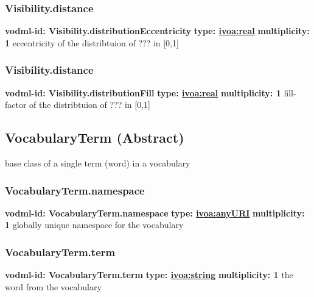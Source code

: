     \subsubsection{Visibility.distance}
      \textbf{vodml-id: Visibility.distributionEccentricity} \newline
      \textbf{type: \hyperref[sect:ivoa]{ivoa:real}} \newline
      \textbf{multiplicity: 1} \newline
      eccentricity of the distribtuion of ??? in [0,1]

    \subsubsection{Visibility.distance}
      \textbf{vodml-id: Visibility.distributionFill} \newline
      \textbf{type: \hyperref[sect:ivoa]{ivoa:real}} \newline
      \textbf{multiplicity: 1} \newline
      fill-factor of the distribtuion of ??? in [0,1]

  \subsection{VocabularyTerm (Abstract)}
  \label{sect:VocabularyTerm}
    base class of a single term (word) in a vocabulary

    \subsubsection{VocabularyTerm.namespace}
      \textbf{vodml-id: VocabularyTerm.namespace} \newline
      \textbf{type: \hyperref[sect:ivoa]{ivoa:anyURI}} \newline
      \textbf{multiplicity: 1} \newline
      globally unique namespace for the vocabulary

    \subsubsection{VocabularyTerm.term}
      \textbf{vodml-id: VocabularyTerm.term} \newline
      \textbf{type: \hyperref[sect:ivoa]{ivoa:string}} \newline
      \textbf{multiplicity: 1} \newline
      the word from the vocabulary

